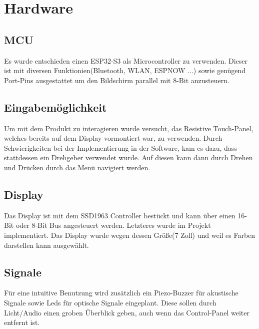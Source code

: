 \section{Hardware}


    \subsection{MCU}
    Es wurde entschieden einen ESP32-S3 als Microcontroller zu verwenden.
    Dieser ist mit diversen Funktionien(Bluetooth, WLAN, ESPNOW ...) 
    sowie genügend Port-Pins ausgestattet um den Bildschirm parallel mit 8-Bit anzusteuern.

    \subsection{Eingabemöglichkeit}
    Um mit dem Produkt zu interagieren wurde versucht, das Resistive Touch-Panel,
    welches bereits auf dem Display vormontiert war, zu verwenden. Durch Schwierigkeiten 
    bei der Implementierung in der Software, kam es dazu, dass stattdessen ein Drehgeber verwendet
    wurde. Auf diesen kann dann durch Drehen und Drücken durch das Menü navigiert werden.

    \subsection{Display}
    Das Display ist mit dem SSD1963 Controller bestückt und kann über 
    einen 16-Bit oder 8-Bit Bus angesteuert werden. Letzteres wurde
    im Projekt implementiert. Das Display wurde wegen dessen Größe(7 Zoll) und weil es Farben
    darstellen kann ausgewählt.

    \subsection{Signale}
    Für eine intuitive Benutzung wird zusätzlich ein Piezo-Buzzer für akustische Signale 
    sowie Leds für optische Signale eingeplant. Diese sollen durch 
    Licht/Audio einen groben Überblick geben, auch wenn das Control-Panel weiter 
    entfernt ist.
